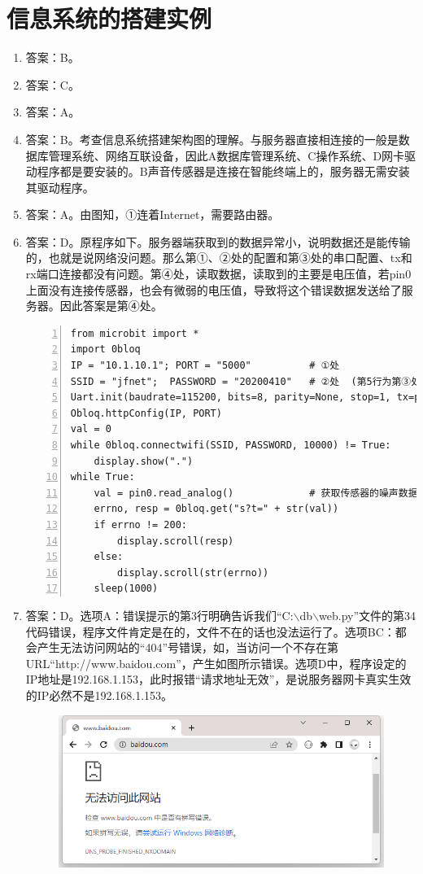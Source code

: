 \section{信息系统的搭建实例}

\begin{enumerate}
\item 答案：B。

\item 答案：C。

\item 答案：A。

\item 答案：B。考查信息系统搭建架构图的理解。与服务器直接相连接的一般是数据库管理系统、网络互联设备，因此A数据库管理系统、C操作系统、D网卡驱动程序都是要安装的。B声音传感器是连接在智能终端上的，服务器无需安装其驱动程序。

\item 答案：A。由图知，①连着Internet，需要路由器。

\item 答案：D。原程序如下。服务器端获取到的数据异常小，说明数据还是能传输的，也就是说网络没问题。那么第①、②处的配置和第③处的串口配置、tx和rx端口连接都没有问题。第④处，读取数据，读取到的主要是电压值，若pin0上面没有连接传感器，也会有微弱的电压值，导致将这个错误数据发送给了服务器。因此答案是第④处。
\begin{lstlisting}[numbers=left]
from microbit import *
import 0bloq
IP = "10.1.10.1"; PORT = "5000"          # ①处
SSID = "jfnet";  PASSWORD = "20200410"   # ②处  (第5行为第③处)
Uart.init(baudrate=115200, bits=8, parity=None, stop=1, tx=pin2, rx=pin1)
Obloq.httpConfig(IP, PORT)
val = 0
while 0bloq.connectwifi(SSID, PASSWORD, 10000) != True:
    display.show(".")
while True:
    val = pin0.read_analog()             # 获取传感器的噪声数据  ④处
    errno, resp = 0bloq.get("s?t=" + str(val))
    if errno != 200:
        display.scroll(resp)
    else:
        display.scroll(str(errno))
    sleep(1000)
\end{lstlisting}

\item 答案：D。选项A：错误提示的第3行明确告诉我们“C:$\backslash$db$\backslash$web.py”文件的第34代码错误，程序文件肯定是在的，文件不在的话也没法运行了。选项BC：都会产生无法访问网站的“404”号错误，如，当访问一个不存在第URL“http://www.baidou.com”，产生如图所示错误。选项D中，程序设定的IP地址是192.168.1.153，此时报错“请求地址无效”，是说服务器网卡真实生效的IP必然不是192.168.1.153。
\begin{figure}[h!]
\centering
\includegraphics[width=0.5\linewidth]{figures/url404}
\end{figure}



\end{enumerate}

